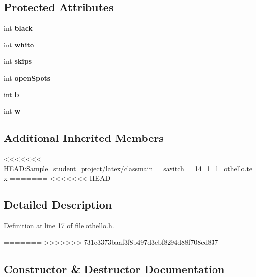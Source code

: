 \subsection*{Protected Attributes}
\begin{DoxyCompactItemize}
\item 
\mbox{\label{classmain__savitch__14_1_1_othello_a2eed818925f68d5678b78107a3298138}} 
int {\bfseries black}
\item 
\mbox{\label{classmain__savitch__14_1_1_othello_a7d5f59b1e581ed7a8145debeecf4f310}} 
int {\bfseries white}
\item 
\mbox{\label{classmain__savitch__14_1_1_othello_a85d4ce17512d8dbf85a313a27eea0644}} 
int {\bfseries skips}
\item 
\mbox{\label{classmain__savitch__14_1_1_othello_a15045e3e94c34afe08240885e230d502}} 
int {\bfseries open\+Spots}
\item 
\mbox{\label{classmain__savitch__14_1_1_othello_a98fbc46241d2f5e05ccb4b66f11535bf}} 
int {\bfseries b}
\item 
\mbox{\label{classmain__savitch__14_1_1_othello_a1b11c5fe33e30a94ed39e8cb55caf37e}} 
int {\bfseries w}
\end{DoxyCompactItemize}
\subsection*{Additional Inherited Members}


<<<<<<< HEAD:Sample_student_project/latex/classmain__savitch__14_1_1_othello.tex
=======
<<<<<<< HEAD
\subsection{Detailed Description}


Definition at line 17 of file othello.\+h.



=======
>>>>>>> 731e3373baaf3f8b497d3ebf8294d88f708cd837
\subsection{Constructor \& Destructor Documentation}
